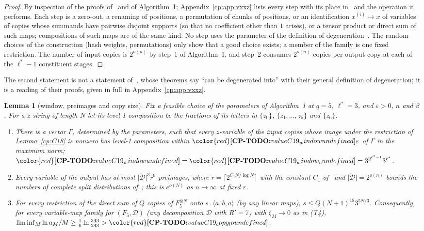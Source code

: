 \documentclass[11pt]{article}
\makeatletter
\newtheorem{lemma}[theorem]{Lemma}
\theoremstyle{definition}
\theoremstyle{remark}
\DeclareRobustCommand{\CPTODO}[1]{{\color{red}\textbf{[CP-TODO:} #1\textbf{]}}}
\providecommand{\eps}{\varepsilon}
\newcommand{\abs}[1]{\lvert #1\rvert}
\newcommand{\mat}[3]{\langle #1,#2,#3\rangle} %
\newcommand{\cp}{\mathbin{.}}                 %
\newcommand{\Tcond}[1]{\textup{(T#1)}}        %
\newcommand{\cpv}[1]{\ifcsname cpv@#1\endcsname\csname cpv@#1\endcsname\else\CPTODO{value #1 undefined}\fi}
\makeatother
\begin{document}
\begin{proof}
By inspection of the proofs of~\cite[Proposition~5.1, Theorem~5.3, Theorem~6.1, Proposition~6.2, Theorem~6.3, Theorem~7.2 and Corollary~4.2]{VXXZ24} and of Algorithm~1; Appendix~\ref{cp:app:vxxz} lists every step with its place in~\cite{VXXZ24} and the operation it performs. Each step is a zero-out, a renaming of positions, a permutation of chunks of positions, or an identification $x^{(i)}\mapsto x$ of variables of copies whose summands have pairwise disjoint supports (so that no coefficient other than $1$ arises), or a tensor product or direct sum of such maps; compositions of such maps are of the same kind. No step uses the parameter of the definition of degeneration~\cite[Section~3.3]{VXXZ24}. The random choices of the construction (hash weights, permutations) only show that a good choice exists; a member of the family is one fixed restriction. The number of input copies is $2^{o(n)}$ by step~1 of Algorithm~1, and step~2 consumes $2^{o(n)}$ copies per output copy at each of the $\ell^*-1$ constituent stages.
\end{proof}

The second statement is not a statement of~\cite{VXXZ24}, whose theorems say ``can be degenerated into'' with their general definition of degeneration; it is a reading of their proofs, given in full in Appendix~\ref{cp:app:vxxz}.

\begin{lemma}[window, preimages and copy size]\label{cp:C19}
Fix a feasible choice of the parameters of Algorithm~1 at $q=5$, $\ell^*=3$, and $\eps>0$, $n$ and $\beta$. For a $z$-string of length $N$ let its level-1 composition be the fractions of its letters in $\{z_0\}$, $\{z_1,\dots,z_5\}$ and $\{z_6\}$.
\begin{enumerate}[label=(\alph*)]
\item There is a vector $\Gamma$, determined by the parameters, such that every $z$-variable of the input copies whose image under the restriction of Lemma~\ref{cp:C18} is nonzero has level-1 composition within $\cpv{C19_window}\eps$ of $\Gamma$ in the maximum norm; $\cpv{C19_window}=\cpv{C19_window_c}=3^{2^{\ell^*-1}}3^{\ell^*}$.
\item Every variable of the output has at most $\abs{\tilde{\mathcal D}}^{3}r^{9}$ preimages, where $r=\lceil2^{C_1N/\log N}\rceil$ with the constant $C_1$ of~\cite[Corollary~4.2]{VXXZ24} and $\abs{\tilde{\mathcal D}}=2^{o(n)}$ bounds the numbers of complete split distributions of~\cite[Theorems~5.3 and~6.3]{VXXZ24}; this is $e^{o(N)}$ as $n\to\infty$ at fixed $\eps$.
\item For every restriction of the direct sum of $Q$ copies of $F_5^{\otimes N}$ onto $s\cp\mat aba$ (by any linear maps), $s\le Q(N+1)^{18}3^{5N/3}$. Consequently, for every variable-map family for $(F_5,\mathcal D)$ (any decomposition $\mathcal D$ with $R'=7$) with $\zeta_M\to0$ as in \Tcond4, $\liminf_M\ln a_M/M\ge\frac16\ln\frac{343}{243}>\cpv{C19_copy_lo}$.
\end{enumerate}
\end{lemma}
\end{document}
